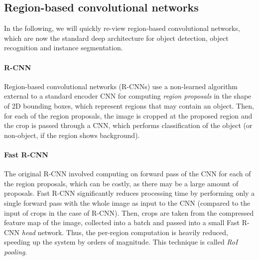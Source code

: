 


\subsection{Region-based convolutional networks}
In the following, we will quickly re-view region-based convolutional networks, which are now the standard deep architecture for
object detection, object recognition and instance segmentation.

\paragraph{R-CNN}
Region-based convolutional networks (R-CNNs) use a non-learned algorithm external to a standard encoder CNN
for computing \emph{region proposals} in the shape of 2D bounding boxes, which represent regions that may contain an object.
Then, for each of the region proposals, the image is cropped at the proposed region and the crop is
passed through a CNN, which performs classification of the object (or non-object, if the region shows background).

\paragraph{Fast R-CNN}
The original R-CNN involved computing on forward pass of the CNN for each of the region proposals,
which can be costly, as there may be a large amount of proposals.
Fast R-CNN significantly reduces processing time by performing only a single forward pass with the whole image
as input to the CNN (compared to the input of crops in the case of R-CNN).
Then, crops are taken from the compressed feature map of the image, collected into a batch and passed into a small Fast R-CNN
\emph{head} network.
Thus, the per-region computation is heavily reduced, speeding up the system by orders of magnitude. %
This technique is called \emph{RoI pooling}.


